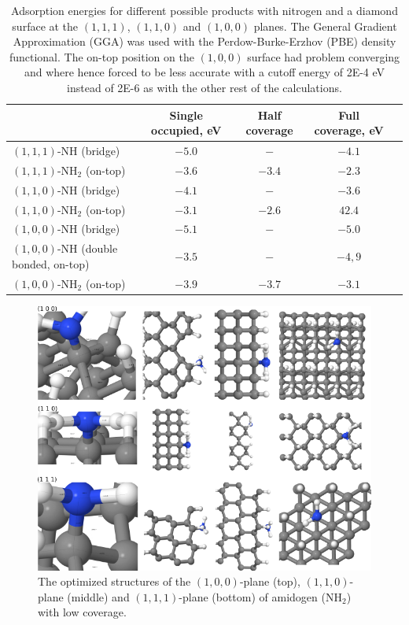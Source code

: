 \documentclass[10pt,a4paper]{article}
\begin{document}
\begin{table}[!h] \caption{Adsorption energies for different possible products with nitrogen and a diamond surface at the $(1,  1, 1)$, $(1,  1,  0)$ and $(1,  0,  0)$ planes. The General Gradient Approximation (GGA) was used with the Perdow-Burke-Erzhov (PBE) density functional. The on-top position on the $(1,  0,  0)$ surface had problem converging and where hence forced to be less accurate with a cutoff energy of 2E-4 eV instead of 2E-6 as with the other rest of the calculations.} \label{adsorptionEnergies}
\begin{adjustbox}{max width=\textwidth}
\begin{tabular}{|l|c|c|c|c|}
								& Single occupied, eV	&  Half coverage 	& Full coverage, eV \\ \hline
$(1,  1, 1)$-NH (bridge)						&$-5.0$ 			& $- $			& $-4.1 $ \\ \hline
$(1,  1, 1)$-NH$_2$ (on-top)					&$-3.6$ 			& $-3.4 $  		& $-2.3 $ \\ \hline
$(1,  1,  0)$-NH (bridge)						&$-4.1$ 			& $- $  		& $-3.6 $ \\ \hline
$(1,  1,  0)$-NH$_2$ (on-top)					&$-3.1$ 			& $-2.6 $ 		& $42.4 $ \\ \hline
$(1,  0,  0)$-NH (bridge)						&$-5.1$ 			& $- $ 		& $-5.0 $ \\ \hline
$(1,  0,  0)$-NH (double bonded, on-top) 			&$-3.5$ 			& $- $ 		& $-4,9 $ \\ \hline
$(1,  0,  0)$-NH$_2$ (on-top)					&$-3.9$ 			& $-3.7 $ 		& $-3.1 $ \\ \hline
\end{tabular}
\end{adjustbox}
\end{table}









\begin{figure} \captionsetup{width=.8\linewidth} \caption{The optimized structures of the $(1,  0,  0)$-plane (top), $(1,  1,  0)$-plane (middle) and $(1,  1, 1)$-plane (bottom) of amidogen (NH$_2$) with low coverage.} \label{NH2_summary_low}
\includegraphics[width=.8\linewidth]{pictures/NH2_summary_low.png}
\end{figure}
\end{document}
